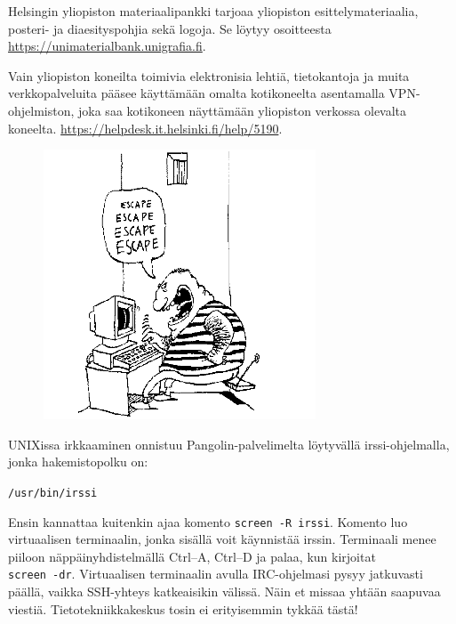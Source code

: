 \documentclass[a5paper, 8pt, twocolumn]{book} %
\numberwithin{equation}{section}
\begin{document}
Helsingin yliopiston materiaalipankki tarjoaa yliopiston esittelymateriaalia, posteri- ja diaesityspohjia sekä logoja. Se löytyy osoitteesta \url{https://unimaterialbank.unigrafia.fi}.

Vain yliopiston koneilta toimivia elektronisia
lehtiä, tietokantoja ja muita verkkopalveluita
pääsee käyttämään omalta kotikoneelta
asentamalla VPN-ohjelmiston,
joka saa kotikoneen näyttämään yliopiston
verkossa olevalta koneelta. \url{https://helpdesk.it.helsinki.fi/help/5190}.

\begin{figure}[!b]
	\centering
	\includegraphics[width=\columnwidth]{escnappi.png}
\end{figure}

UNIXissa irkkaaminen onnistuu Pangolin-palvelimelta
löytyvällä irssi-ohjelmalla,
jonka hakemistopolku on: 

\noindent\texttt{/usr/bin/irssi}

Ensin kannattaa kuitenkin ajaa komento \texttt{screen -R irssi}. Komento luo virtuaalisen terminaalin, jonka sisällä voit käynnistää irssin. Terminaali menee piiloon näppäinyhdistelmällä Ctrl--A, Ctrl--D ja palaa, kun kirjoitat \\\texttt{screen -dr}. Virtuaalisen terminaalin avulla IRC-ohjelmasi pysyy jatkuvasti päällä, vaikka SSH-yhteys katkeaisikin välissä. Näin et missaa yhtään saapuvaa viestiä. Tieto\-tekniikka\-keskus tosin ei erityisemmin tykkää tästä!
\end{document}
